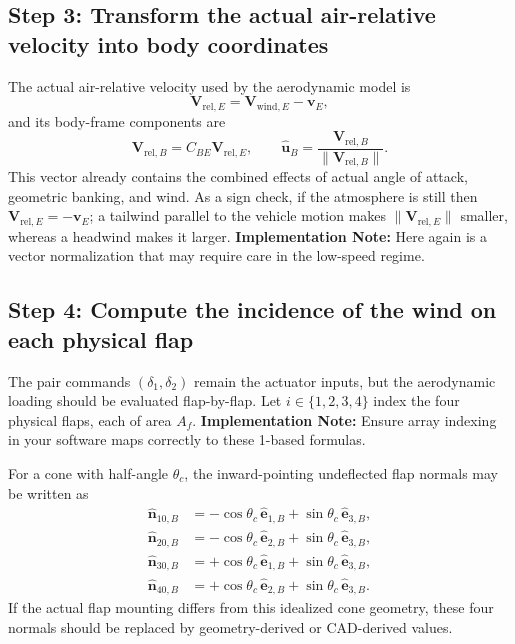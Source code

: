 \subsection{Step 3: Transform the actual air-relative velocity into body coordinates}

The actual air-relative velocity used by the aerodynamic model is
\begin{equation}
\mathbf V_{\mathrm{rel},E}
=
\mathbf V_{\mathrm{wind},E}-\mathbf v_E,
\end{equation}
and its body-frame components are
\begin{equation}
\mathbf V_{\mathrm{rel},B}
=
C_{BE}\mathbf V_{\mathrm{rel},E},
\qquad
\hat{\mathbf u}_B
=
\frac{\mathbf V_{\mathrm{rel},B}}
{\|\mathbf V_{\mathrm{rel},B}\|}. \label{eq:rel_wind_step3}
\end{equation}
This vector already contains the combined effects of actual angle of attack, geometric banking, and wind. As a sign check, if the atmosphere is still then \(\mathbf V_{\mathrm{rel},E}=-\mathbf v_E\); a tailwind parallel to the vehicle motion makes \(\|\mathbf V_{\mathrm{rel},E}\|\) smaller, whereas a headwind makes it larger. \textbf{Implementation Note:} Here again is a vector normalization that may require care in the low-speed regime.

\subsection{Step 4: Compute the incidence of the wind on each physical flap}

The pair commands \((\delta_1,\delta_2)\) remain the actuator inputs, but the aerodynamic loading should be evaluated flap-by-flap. Let \(i\in\{1,2,3,4\}\) index the four physical flaps, each of area \(A_f\). \textbf{Implementation Note:} Ensure array indexing in your software maps correctly to these 1-based formulas. 

For a cone with half-angle \(\theta_c\), the inward-pointing undeflected flap normals may be written as
\begin{equation}
\begin{aligned}
\hat{\mathbf n}_{10,B}
&=
-\cos\theta_c\,\hat{\mathbf e}_{1,B}
+\sin\theta_c\,\hat{\mathbf e}_{3,B}, \\
\hat{\mathbf n}_{20,B}
&=
-\cos\theta_c\,\hat{\mathbf e}_{2,B}
+\sin\theta_c\,\hat{\mathbf e}_{3,B}, \\
\hat{\mathbf n}_{30,B}
&=
+\cos\theta_c\,\hat{\mathbf e}_{1,B}
+\sin\theta_c\,\hat{\mathbf e}_{3,B}, \\
\hat{\mathbf n}_{40,B}
&=
+\cos\theta_c\,\hat{\mathbf e}_{2,B}
+\sin\theta_c\,\hat{\mathbf e}_{3,B}.
\end{aligned} \label{eq:flap_normals}
\end{equation}
If the actual flap mounting differs from this idealized cone geometry, these four normals should be replaced by geometry-derived or CAD-derived values.


